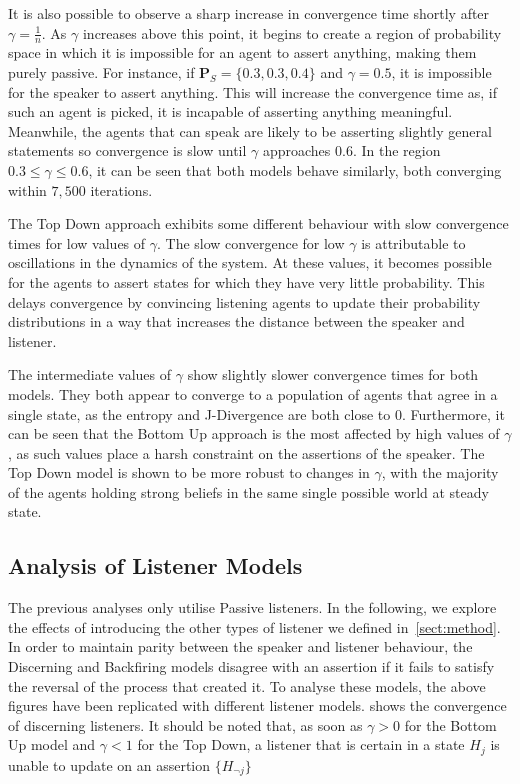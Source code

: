 It is also possible to observe a sharp increase in convergence time shortly after $ \gamma = \frac{1}{n}$. As $\gamma$ increases above this point, it begins to create a region of probability space in which it is impossible for an agent to assert anything, making them purely passive. For instance, if $\mathbf{P}_S =\{ 0.3, 0.3, 0.4\}$ and $\gamma = 0.5$, it is impossible for the speaker to assert anything. This will increase the convergence time as, if such an agent is picked, it is incapable of asserting anything meaningful. Meanwhile, the agents that can speak are likely to be asserting slightly general statements so convergence is slow until $\gamma$ approaches $0.6$. In the region $0.3 \leq \gamma \leq 0.6$, it can be seen that both models behave similarly, both converging within $7,500$ iterations. 

The Top Down approach exhibits some different behaviour with slow convergence times for low values of $\gamma$. The slow convergence for low $\gamma$ is attributable to oscillations in the dynamics of the system. At these values, it becomes possible for the agents to assert states for which they have very little probability. This delays convergence by convincing listening agents to update their probability distributions in a way that increases the distance between the speaker and listener. 

The intermediate values of $\gamma$ show slightly slower convergence times for both models. They both appear to converge to a population of agents that agree in a single state, as the entropy and J-Divergence are both close to $0$. Furthermore, it can be seen that the Bottom Up approach is the most affected by high values of $\gamma$, as such values place a harsh constraint on the assertions of the speaker. The Top Down model is shown to be more robust to changes in $\gamma$, with the majority of the agents holding strong beliefs in the same single possible world at steady state.  


\subsection{Analysis of Listener Models}

The previous analyses only utilise Passive listeners. In the following, we explore the effects of introducing the other types of listener we defined in~\cref{sect:method}. In order to maintain parity between the speaker and listener behaviour, the Discerning and Backfiring models disagree with an assertion if it fails to satisfy the reversal of the process that created it. To analyse these models, the above figures have been replicated with different listener models.  shows the convergence of discerning listeners. It should be noted that, as soon as $\gamma > 0$ for the Bottom Up model and $\gamma < 1$ for the Top Down, a listener that is certain in a state $H_j$ is unable to update on an assertion $\{ H_{¬j} \}$


